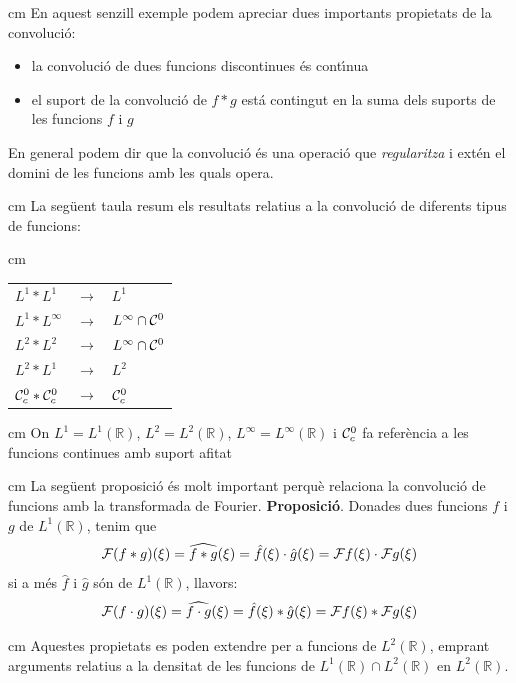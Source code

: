 \documentclass{article}
\def\R{\mathbb R}
\begin{document}
 cm
En aquest senzill exemple podem apreciar dues importants propietats de la
convoluci\'o:
\begin{itemize}
\item la convoluci\'o de dues funcions discontinues \'es cont\'\i nua
\item el suport de la convoluci\'o de $f * g$ est\'a contingut en la suma 
dels suports de les funcions $f$ i $g$
\end{itemize}
\noindent
En general podem dir que la convoluci\'o \'es una operaci\'o que 
{\it regularitza} i ext\'en el domini de les funcions amb les quals opera.
    
 cm
La seg\"uent taula resum els resultats relatius a la convoluci\'o de 
diferents tipus de funcions:

 cm

\begin{center}
\begin{tabular}{lcl}
  $L^1 * L^1$                  & $\longrightarrow$ & $L^1$ \\
  $L^1 * L^\infty$             & $\longrightarrow$ & 
$L^{\infty} \cap {\cal C}^0$ \\
  $L^2 * L^2$                  & $\longrightarrow$ & 
$L^\infty \cap {\cal C}^0$ \\
  $L^2 * L^1$                  & $\longrightarrow$ & 
$L^2$ \\
  ${\cal C}^0_c *{\cal C}^0_c$ & $\longrightarrow$ & ${\cal C}^0_c$
\end{tabular}
\end{center}

 cm
\noindent
On $L^1=L^1(\R)$, $L^2=L^2(\R)$, $L^\infty=L^\infty(\R)$ i 
${\cal C}^0_c$ fa refer\`encia a les funcions continues amb suport afitat 

 cm
La seg\"uent proposici\'o \'es molt important perqu\`e relaciona la 
convoluci\'o de funcions amb la transformada de Fourier.
\newline
\noindent
\textbf{Proposici\'o}.
Donades dues funcions $f$ i $g$ de $L^1(\R)$, tenim que 
\[
{\cal F} ( f * g ) (\xi) = \widehat{f * g}(\xi)=
\hat{f} (\xi) \cdot \hat{g} (\xi)={\cal F} f (\xi) \cdot {\cal F} g (\xi)
\]
\noindent
si a m\'es $\hat{f}$ i $\hat{g}$ s\'on de $L^1(\R)$, llavors:
\[
{\cal F} ( f \cdot  g ) (\xi) = \widehat{f \cdot g}(\xi)=
\hat{f} (\xi) * \hat{g} (\xi)={\cal F} f (\xi) * {\cal F} g (\xi)
\]

 cm
\noindent
Aquestes propietats es poden extendre per a funcions de $L^2(\R)$, emprant
arguments relatius a la densitat de les funcions de 
$L^1(\R) \cap L^2(\R)$ en $L^2(\R)$.
\end{document}
